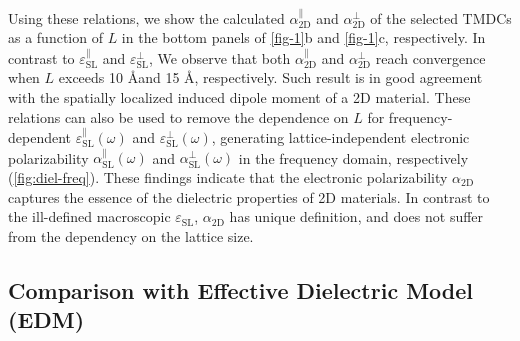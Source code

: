 %
%
Using these relations, we show the calculated
$\alpha_{\mathrm{2D}}^{\parallel}$ and $\alpha_{\mathrm{2D}}^{\perp}$
of the selected TMDCs as a function of $L$ in the bottom panels of
 \autoref{fig-1}b and \autoref{fig-1}c, respectively.  In contrast to
$\varepsilon_{\mathrm{SL}}^{\parallel}$ and
$\varepsilon_{\mathrm{SL}}^{\perp}$, We observe that both
$\alpha_{\mathrm{2D}}^{\parallel}$ and $\alpha_{\mathrm{2D}}^{\perp}$
reach convergence when $L$ exceeds 10 \AA and 15 \AA,
respectively. Such result is in good agreement with the spatially
localized induced dipole moment of a 2D material.
%
%
These relations can also be used to remove the dependence on $L$ for
frequency-dependent $\varepsilon^{\parallel}_{\mathrm{SL}}(\omega)$
and $\varepsilon^{\perp}_{\mathrm{SL}}(\omega)$, generating
lattice-independent electronic polarizability
$\alpha^{\parallel}_{\mathrm{SL}}(\omega)$ and
$\alpha^{\perp}_{\mathrm{SL}}(\omega)$ in the frequency domain,
respectively (\autoref{fig:diel-freq}).
%
% 
% 
% 
% 
These findings indicate that the electronic polarizability
$\alpha_{\mathrm{2D}}$ captures the essence of the dielectric
properties of 2D materials. In contrast to the ill-defined macroscopic
$\varepsilon_{\mathrm{SL}}$, $\alpha_{\mathrm{2D}}$ has unique
definition, and does not suffer from the dependency on the lattice
size.

\subsection{Comparison with Effective Dielectric Model (EDM)}
\label{sec:diel-comp-with-effect}

